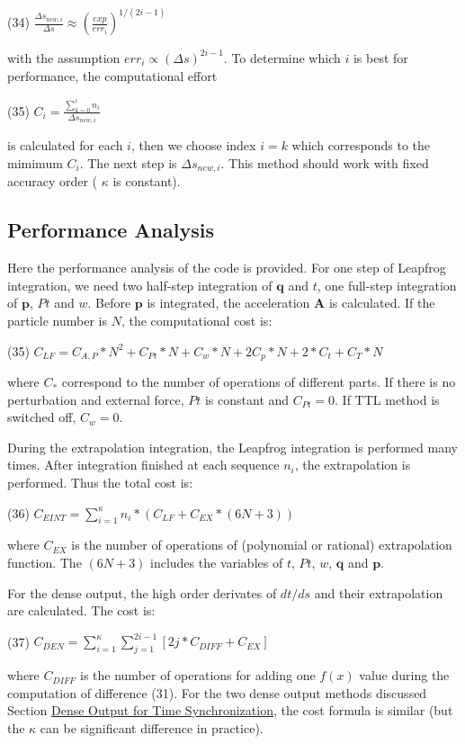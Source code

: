 (34) $ \frac{\Delta s_{new,i}}{\Delta s} \approx \left(\frac{exp}{err_{i}}\right)^{1/(2i-1)} $

with the assumption $ err_i \propto (\Delta s)^{2i-1} $. To determine which $ i$ is best for performance, the computational effort

(35) $ C_i = \frac{\sum_{k=0}^i n_i}{\Delta s_{new,i}} $

is calculated for each $ i $, then we choose index $ i=k $ which corresponds to the mimimum $ C_i $. The next step is $ \Delta s_{new,i} $. This method should work with fixed accuracy order ( $ \kappa $ is constant).\hypertarget{index_perf_sec}{}\subsection{Performance Analysis}\label{index_perf_sec}
Here the performance analysis of the code is provided. For one step of Leapfrog integration, we need two half-\/step integration of $ \mathbf{q} $ and $ t $, one full-\/step integration of $ \mathbf{p} $, $ Pt $ and $ w $. Before $ \mathbf{p} $ is integrated, the acceleration $ \mathbf{A} $ is calculated. If the particle number is $ N $, the computational cost is\+:

(35) $ C_{LF} = C_{A,P}*N^2 + C_{Pt}*N + C_{w}*N + 2C_{p}*N + 2*C_{t} + C_{T}*N $

where $ C_* $ correspond to the number of operations of different parts. If there is no perturbation and external force, $ Pt $ is constant and $ C_{Pt} = 0$. If T\+TL method is switched off, $ C_{w} = 0$.

During the extrapolation integration, the Leapfrog integration is performed many times. After integration finished at each sequence $ n_i $, the extrapolation is performed. Thus the total cost is\+:

(36) $ C_{EINT} = \sum_{i=1}^\kappa n_i*(C_{LF} + C_{EX}*(6N+3))$

where $ C_{EX} $ is the number of operations of (polynomial or rational) extrapolation function. The $ (6N+3) $ includes the variables of $ t $, $ Pt $, $ w $, $ \mathbf{q} $ and $ \mathbf{p} $.

For the dense output, the high order derivates of $ dt/ds $ and their extrapolation are calculated. The cost is\+:

(37) $ C_{DEN} = \sum_{i=1}^\kappa \sum_{j=1}^{2i-1} [2j*C_{DIFF} + C_{EX}] $

where $ C_{DIFF} $ is the number of operations for adding one $ f(x) $ value during the computation of difference (31). For the two dense output methods discussed Section \hyperlink{index_dense_sec}{Dense Output for Time Synchronization}, the cost formula is similar (but the $ \kappa $ can be significant difference in practice).

